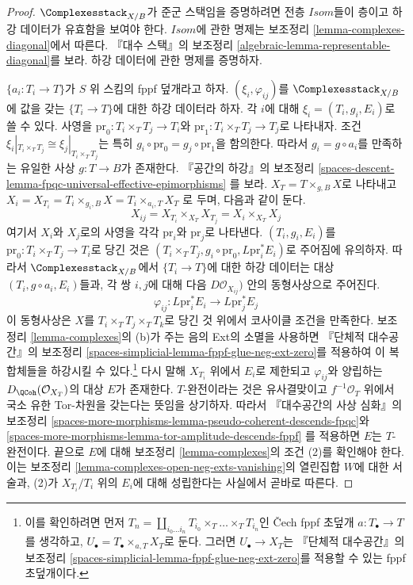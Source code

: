 \begin{proof}
$\Complexesstack_{X/B}$가 준군 스택임을 증명하려면 전층 $\mathit{Isom}$들이
층이고 하강 데이터가 유효함을 보여야 한다. $\mathit{Isom}$에 관한 명제는
보조정리 \ref{lemma-complexes-diagonal}에서 따른다. 『대수 스택』의 보조정리
\ref{algebraic-lemma-representable-diagonal}를 보라. 하강 데이터에 관한 명제를
증명하자.

\medskip\noindent
$\{a_i : T_i \to T\}$가 $S$ 위 스킴의 fppf 덮개라고 하자.
$(\xi_i, \varphi_{ij})$를 $\Complexesstack_{X/B}$에 값을 갖는
$\{T_i \to T\}$에 대한 하강 데이터라 하자. 각 $i$에 대해
$\xi_i = (T_i, g_i, E_i)$로 쓸 수 있다. 사영을
$\text{pr}_0 : T_i \times_T T_j \to T_i$와
$\text{pr}_1 : T_i \times_T T_j \to T_j$로 나타내자. 조건
$\xi_i|_{T_i \times_T T_j} \cong \xi_j|_{T_i \times_T T_j}$는 특히
$g_i \circ \text{pr}_0 = g_j \circ \text{pr}_1$을 함의한다. 따라서
$g_i = g \circ a_i$를 만족하는 유일한 사상 $g : T \to B$가 존재한다.
『공간의 하강』의 보조정리
\ref{spaces-descent-lemma-fpqc-universal-effective-epimorphisms}
를 보라. $X_T = T \times_{g, B} X$로 나타내고
$X_i = X_{T_i} = T_i \times_{g_i, B} X = T_i \times_{a_i, T} X_T$
로 두며, 다음과 같이 둔다.
$$
X_{ij} = X_{T_i} \times_{X_T} X_{T_j} = X_i \times_{X_T} X_j
$$
여기서 $X_i$와 $X_j$로의 사영을 각각 $\text{pr}_i$와 $\text{pr}_j$로
나타낸다. $(T_i, g_i, E_i)$를 $\text{pr}_0 : T_i \times_T T_j \to T_i$로
당긴 것은 $(T_i \times_T T_j, g_i \circ \text{pr}_0, L\text{pr}_i^*E_i)$로
주어짐에 유의하자. 따라서 $\Complexesstack_{X/B}$에서
$\{T_i \to T\}$에 대한 하강 데이터는 대상 $(T_i, g \circ a_i, E_i)$들과,
각 쌍 $i, j$에 대해 다음 $D\mathcal{O}_{X_{ij}})$ 안의 동형사상으로 주어진다.
$$
\varphi_{ij} :
L\text{pr}_i^*E_i \longrightarrow L\text{pr}_j^*E_j
$$
이 동형사상은 $X$를 $T_i \times_T T_j \times_T T_k$로 당긴 것 위에서
코사이클 조건을 만족한다. 보조정리 \ref{lemma-complexes}의 (b)가 주는 음의
Ext의 소멸을 사용하면 『단체적 대수공간』의 보조정리
\ref{spaces-simplicial-lemma-fppf-glue-neg-ext-zero}를 적용하여 이 복합체들을
하강시킬 수 있다.\footnote{이를 확인하려면 먼저
$T_n = \coprod_{i_0 \ldots i_n} T_{i_0} \times_T \ldots \times_T T_{i_n}$인
{\v C}ech fppf 초덮개 $a : T_\bullet \to T$를 생각하고,
$U_\bullet = T_\bullet \times_{a, T} X_T$로 둔다. 그러면
$U_\bullet \to X_T$는 『단체적 대수공간』의 보조정리
\ref{spaces-simplicial-lemma-fppf-glue-neg-ext-zero}를 적용할 수 있는 fppf
초덮개이다.} 다시 말해 $X_{T_i}$ 위에서 $E_i$로 제한되고
$\varphi_{ij}$와 양립하는 $D_\QCoh(\mathcal{O}_{X_T})$의 대상 $E$가 존재한다.
$T$-완전이라는 것은 유사결맞이고 $f^{-1}\mathcal{O}_T$ 위에서 국소 유한
Tor-차원을 갖는다는 뜻임을 상기하자. 따라서 『대수공간의 사상 심화』의
보조정리
\ref{spaces-more-morphisms-lemma-pseudo-coherent-descends-fpqc}와
\ref{spaces-more-morphisms-lemma-tor-amplitude-descends-fppf}
를 적용하면 $E$는 $T$-완전이다. 끝으로 $E$에 대해 보조정리
\ref{lemma-complexes}의 조건 (2)를 확인해야 한다. 이는 보조정리
\ref{lemma-complexes-open-neg-exts-vanishing}의 열린집합 $W$에 대한 서술과,
(2)가 $X_{T_i}/T_i$ 위의 $E_i$에 대해 성립한다는 사실에서 곧바로 따른다.
\end{proof}


